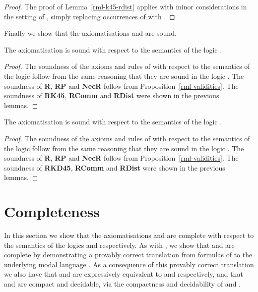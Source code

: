 \begin{proof}
The proof of Lemma~\ref{rml-k45-rdist} applies with minor considerations in the setting of \logicRmlKD{}, simply replacing occurrences of \classKFF{} with \classKD{}.
\end{proof}

Finally we show that the axiomatisations \axiomRmlKFF{} and \axiomRmlKD{} are sound.

\begin{lemma}\label{rml-k45-sound}
The axiomatisation \axiomRmlKFF{} is sound with respect to the semantics of the logic \logicRmlKFF{}.
\end{lemma}

\begin{proof}
The soundness of the axioms and rules of \axiomKFF{} with respect to the semantics of the logic \logicRmlKFF{} follow from the same reasoning that they are sound in the logic \logicKFF{}.
The soundness of {\bf R}, {\bf RP} and {\bf NecR} follow from Proposition~\ref{rml-validities}.
The soundness of {\bf RK45}, {\bf RComm} and {\bf RDist} were shown in the previous lemmas.
\end{proof}

\begin{lemma}\label{rml-kd45-sound}
The axiomatisation \axiomRmlKD{} is sound with respect to the semantics of the logic \logicRmlKD{}.
\end{lemma}

\begin{proof}
The soundness of the axioms and rules of \axiomKD{} with respect to the semantics of the logic \logicRmlKD{} follow from the same reasoning that they are sound in the logic \logicKD{}.
The soundness of {\bf R}, {\bf RP} and {\bf NecR} follow from Proposition~\ref{rml-validities}.
The soundness of {\bf RKD45}, {\bf RComm} and {\bf RDist} were shown in the previous lemmas.
\end{proof}

\section{Completeness}\label{rml-kd45-completeness}

In this section we show that the axiomatisations \axiomRmlKFF{} and \axiomRmlKD{} are complete with respect to the semantics of the logics \logicRmlKFF{} and \axiomRmlKD{} respectively.
As with \axiomRmlK{}, we show that \axiomRmlKFF{} and \axiomRmlKD{} are complete by demonstrating a provably correct translation from formulas of \langRml{} to the underlying modal language \langMl{}.
As a consequence of this provably correct translation we also have that \logicRmlKFF{} and \logicRmlKD{} are expressively equivalent to \logicKFF{} and \logicRmlKD{} respectively, and that \logicRmlKFF{} and \logicRmlKD{} are compact and decidable, via the compactness and decidability of \logicKFF{} and \logicKD{}.

